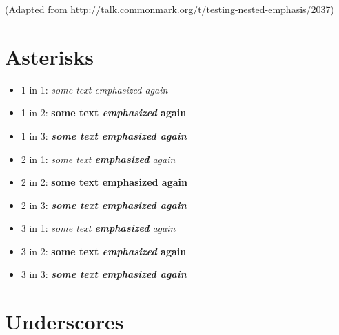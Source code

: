 
\def\mytitle{Strong and Emphasis}


(Adapted from \href{http://talk.commonmark.org/t/testing-nested-emphasis/2037}{http:/\slash talk.commonmark.org\slash t\slash testing-nested-emphasis\slash 2037})

\chapter{Asterisks}
\label{asterisks}

\begin{itemize}
\item 1 in 1: \emph{some text \emph{emphasized} again}

\item 1 in 2: \textbf{some text \emph{emphasized} again}

\item 1 in 3: \textbf{\emph{some text \emph{emphasized} again}}

\item 2 in 1: \emph{some text \textbf{emphasized} again}

\item 2 in 2: \textbf{some text \textbf{emphasized} again}

\item 2 in 3: \textbf{\emph{some text \textbf{emphasized} again}}

\item 3 in 1: \emph{some text \textbf{\emph{emphasized}} again}

\item 3 in 2: \textbf{some text \textbf{\emph{emphasized}} again}

\item 3 in 3: \textbf{\emph{some text \textbf{\emph{emphasized}} again}}

\end{itemize}

\chapter{Underscores}
\label{underscores}

